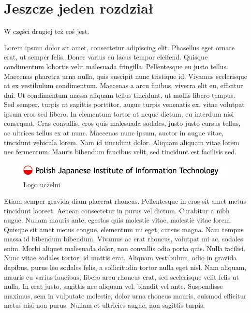 \chapter{Jeszcze jeden rozdział}

W części drugiej też coś jest.

Lorem ipsum dolor sit amet, consectetur adipiscing elit. Phasellus eget ornare
erat, ut semper felis. Donec varius eu lacus tempor eleifend. Quisque
condimentum lobortis velit malesuada fringilla. Pellentesque eu justo tellus.
Maecenas pharetra urna nulla, quis suscipit nunc tristique id. Vivamus
scelerisque at ex vestibulum condimentum. Maecenas a arcu finibus, viverra elit
eu, efficitur dui. Ut condimentum massa aliquam tellus tincidunt, ut mollis
libero tempus. Sed semper, turpis ut sagittis porttitor, augue turpis venenatis
ex, vitae volutpat ipsum eros sed libero. In elementum tortor at neque dictum,
eu interdum nisi consequat. Cras convallis, eros quis malesuada sodales, justo
justo cursus tellus, ac ultrices tellus ex at nunc. Maecenas nunc ipsum, auctor
in augue vitae, tincidunt vehicula lorem. Nam id tincidunt dolor. Aliquam
aliquam vitae lorem nec fermentum. Mauris bibendum faucibus velit, sed tincidunt
est facilisis sed.

\begin{figure}
    \centering
    \includegraphics[width=14cm]{pjwstk_logo}
    \caption{Logo uczelni}
    \label{logo_uczelni}
\end{figure}

Etiam semper gravida diam placerat rhoncus. Pellentesque in eros sit amet metus
tincidunt laoreet. Aenean consectetur in purus vel dictum. Curabitur a nibh
augue. Nullam mauris ante, egestas quis molestie vitae, molestie vitae lorem.
Quisque sit amet metus congue, elementum mi eget, cursus magna. Nam tempus massa
id bibendum bibendum. Vivamus ac erat rhoncus, volutpat mi ac, sodales enim.
Morbi aliquet malesuada dolor, non convallis odio porta quis. Nulla facilisi.
Nunc vitae sodales tortor, id mattis erat. Aliquam vestibulum, odio in gravida
dapibus, purus leo sodales felis, a sollicitudin tortor nulla eget nisl. Nam
aliquam, mauris eu varius faucibus, libero arcu rhoncus erat, sed scelerisque
velit felis ut nulla. In erat justo, sagittis nec aliquam vel, blandit vel
ante. Suspendisse maximus, sem in vulputate molestie, dolor urna rhoncus
mauris, euismod efficitur metus nisi non purus. Nullam et ultricies augue, non
sagittis turpis.

